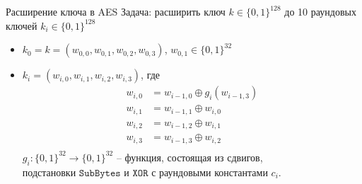 \documentclass[usenames,dvipsnames,8pt,aspectratio=169]{beamer}
\begin{document}
\begin{frame}{Расширение ключа в AES}
	\Large
	Задача: расширить ключ $k  \in \{0,1\}^{128}$ до 10 раундовых ключей $k_i \in \{0,1\}^{128}$
	
	\vspace{20pt}
	
	\LARGE
	\begin{itemize}
		\itemsep 10pt
		\item $k_0 = k = (w_{0,0}, w_{0,1}, w_{0,2}, w_{0,3})$, $w_{0,1} \in \{0,1\}^{32}$
		
		\item $k_i = (w_{i,0}, w_{i,1}, w_{i,2}, w_{i,3})$, где
		\begin{align*}
			w_{i,0} &= w_{i-1, 0} \oplus g_i(w_{i-1, 3}) \\	
			w_{i,1} &= w_{i-1, 1} \oplus w_{i, 0} \\
			w_{i,2} &= w_{i-1, 2} \oplus w_{i, 1} \\
			w_{i,3} &= w_{i-1, 3} \oplus w_{i, 2} \\
		\end{align*}
		$g_i : \{0,1\}^{32} \rightarrow \{0,1\}^{32}  $ -- функция, состоящая из сдвигов, \\ подстановки $\mathtt{SubBytes}$ и $\mathtt{XOR}$ с раундовыми константами $c_i$.
	\end{itemize}
\end{frame}
\end{document}
